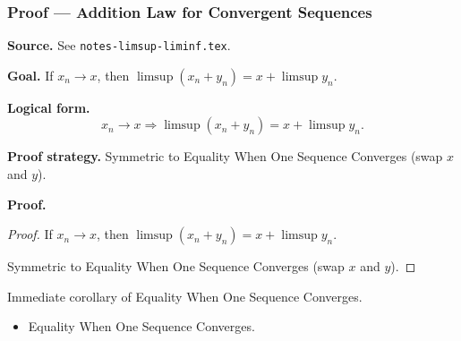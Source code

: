 
\clearpage
{}
\hypertarget{proof-RA-ABB-T-limsup-addition-law}{}

\subsubsection[Addition Law for Convergent Sequences]{Proof --- Addition Law for Convergent Sequences}

\bigskip

\noindent
\textbf{Source.} See \texttt{notes-limsup-liminf.tex}.

\vspace{0.75em}

\noindent
\textbf{Goal.} If $x_n \to x$, then $\limsup(x_n + y_n) = x + \limsup y_n$.

\vspace{0.75em}

\noindent
\textbf{Logical form.}
\[
  x_n \to x \Rightarrow \limsup(x_n + y_n) = x + \limsup y_n.
\]

\vspace{0.75em}

\noindent
\textbf{Proof strategy.} Symmetric to Equality When One Sequence Converges (swap $x$ and $y$).

\vspace{0.75em}

\noindent
\textbf{Proof.}
\begin{proof}
\Claim If $x_n \to x$, then $\limsup(x_n + y_n) = x + \limsup y_n$.

\Given 

\Goal 

\Strategy Symmetric to Equality When One Sequence Converges (swap $x$ and $y$).

\medskip


\end{proof}

\begin{remark*}
Immediate corollary of Equality When One Sequence Converges.
\end{remark*}

\begin{remark*}[Dependencies]
\begin{itemize}
  \item Equality When One Sequence Converges.
\end{itemize}
\end{remark*}

